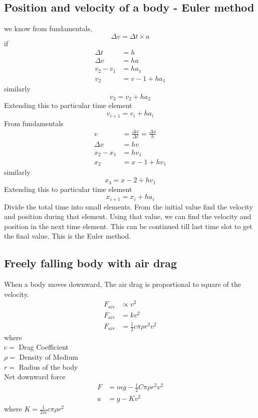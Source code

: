 \documentclass[12pt,a4paper]{article}
\begin{document}
	\subsection{Position and velocity of a body - Euler method}
	we know from fundamentals,
	\begin{equation}
		\Delta v=\Delta t \times a
	\end{equation}
	if
	\begin{align}
		\Delta t&= h \\
		\Delta v &= ha\\
		v_2-v_1 &= ha_1\\
		v_2&=v-1+ha_1
	\end{align}
		similarly
	\begin{equation}
		v_3=v_2+ha_2
	\end{equation}
	Extending this to particular time element
	\begin{equation}
		v_{i+1}=v_i+ha_i
	\end{equation}
	From fundamentals
	\begin{align}
		v&=\frac{\Delta x}{\Delta t}=\frac{\Delta x}{h}\\
		\Delta x &= hv \\
		x_2-x_1 &= hv_1\\
		x_2&=x-1+hv_1
	\end{align}
	similarly
	\begin{equation}
		x_3=x-2+hv_1
	\end{equation}
	Extending this to particular time element
	\begin{equation}
		x_{i+1}=x_i+ha_i
	\end{equation}
	Divide the total time into small elements. From the initial value find the velocity and position during that element.
	Using that value, we can find the velocity and  position in the next time element. This can be continued till last time slot to get the final value.
	This is the Euler method.
	\subsection{Freely falling body with air drag}
	When a body moves downward, The air drag is proportional to square of the velocity.
	\begin{align}
		F_{air}&\propto v^2\\
		F_{air}&=kv^2\\
		F_{air}&=\frac{1}{2}c \pi \rho r^2 v^2
	\end{align}
	where\\
	\(c = \) Drag Coefficient\\
	\(\rho = \) Density of Medium\\
	\(r = \) Radius of the body\\
	Net downward force 
	\begin{align}
		F&=mg-\frac{1}{2}C \pi \rho r^2 v^2\\
		a&= g-Kv^2
	\end{align}
	where \(K=\frac{1}{2m}c\pi \rho r^2\)
\end{document}
